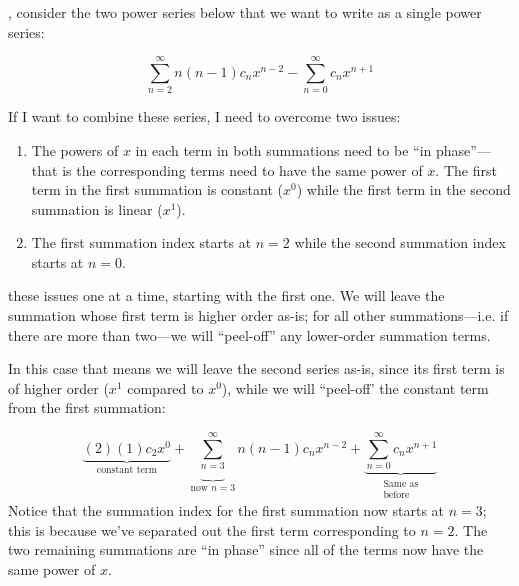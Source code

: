 , consider the two power series below that we want to write as a single power series:

\begin{equation*}
\sum\limits_{n=2}^{\infty} n(n-1)c_n x^{n-2} - \sum\limits_{n=0}^{\infty} c_n x^{n+1}
\end{equation*}

\noindent If I want to combine these series, I need to overcome two issues:
\begin{enumerate}

\item The powers of $x$ in each term in both summations need to be ``in phase''---that is the corresponding terms need to have the same power of $x$.  The first term in the first summation is constant ($x^0$) while the first term in the second summation is linear ($x^1$). 


\item The first summation index starts at $n=2$ while the second summation index starts at $n=0$.

\end{enumerate}


 these issues one at a time, starting with the first one.  We will leave the summation whose first term is higher order as-is; for all other summations---i.e. if there are more than two---we will ``peel-off'' any lower-order summation terms.

In this case that means we will leave the second series as-is, since its first term is of higher order ($x^1$ compared to $x^0$), while we will ``peel-off' the constant term from the first summation:

$$\underbrace{(2)(1)c_2x^0}_{\text{constant term}} + \underbrace{\sum\limits_{n=3}^{\infty}}_{\text{now }n=3} n(n-1)c_nx^{n-2} + \underbrace{\sum\limits_{n=0}^{\infty}c_nx^{n+1}}_{\substack{\text{Same as}\\ \text{before}}}$$
Notice that the summation index for the first summation now starts at $n=3$; this is because we've separated out the first term corresponding to $n=2$.  The two remaining summations are ``in phase'' since all of the terms now have the same power of $x$.

